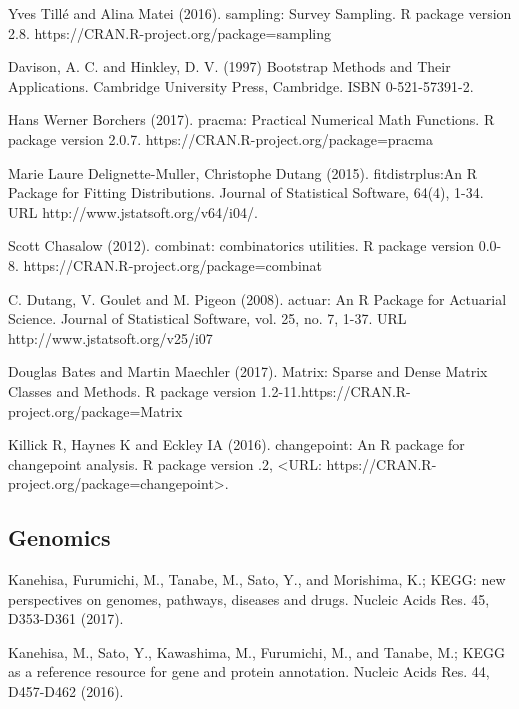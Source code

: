 \documentclass[preprint, 8pt]{elsarticle}
\theoremstyle{definition}
\begin{document}
\begin{table}[H]
\begin{thebibliography}{00}
Yves Tillé and Alina Matei (2016). 
\newblock sampling: Survey Sampling. 
\newblock R package version 2.8. https://CRAN.R-project.org/package=sampling

 Davison, A. C. and Hinkley, D. V. (1997) 
\newblock Bootstrap Methods and Their Applications. 
\newblock Cambridge University Press, Cambridge. ISBN 0-521-57391-2.

Hans Werner Borchers (2017). 
\newblock pracma: Practical Numerical Math Functions. 
\newblock R package version 2.0.7. https://CRAN.R-project.org/package=pracma

Marie Laure Delignette-Muller, Christophe Dutang (2015). 
\newblock fitdistrplus:An R Package for Fitting Distributions. 
\newblock Journal of Statistical Software, 64(4), 1-34. URL http://www.jstatsoft.org/v64/i04/.

 Scott Chasalow (2012). 
\newblock combinat: combinatorics utilities. 
\newblock R package version 0.0-8. https://CRAN.R-project.org/package=combinat

 C. Dutang, V. Goulet and M. Pigeon (2008). 
\newblock actuar: An R Package for Actuarial Science. 
\newblock Journal of Statistical Software, vol. 25, no. 7, 1-37. URL http://www.jstatsoft.org/v25/i07

 Douglas Bates and Martin Maechler (2017). 
\newblock Matrix: Sparse and Dense Matrix Classes and Methods. 
\newblock R package version 1.2-11.https://CRAN.R-project.org/package=Matrix

 Killick R, Haynes K and Eckley IA (2016).
\newblock changepoint: An R package for changepoint analysis. R package version
.2, <URL: https://CRAN.R-project.org/package=changepoint>.

\subsection{Genomics}

 Kanehisa, Furumichi, M., Tanabe, M., Sato, Y., and Morishima, K.; 
\newblock KEGG: new perspectives on genomes, pathways, diseases and drugs. 
\newblock Nucleic Acids Res. 45, D353-D361 (2017).

 Kanehisa, M., Sato, Y., Kawashima, M., Furumichi, M., and Tanabe, M.; 
\newblock KEGG as a reference resource for gene and protein annotation. 
\newblock Nucleic Acids Res. 44, D457-D462 (2016).


\end{thebibliography}
\end{table}
\end{document}
